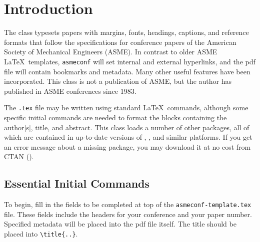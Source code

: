 \documentclass[captionpatch,colorlinks,upint,subscriptcorrection,varvw,german]{asmeconf}
\begin{document}
\begin{nomenclature}



\end{nomenclature}


\section{Introduction}
The \texttt{} class typesets papers with margins, fonts, headings, captions, and reference formats that follow the specifications for conference papers of the American Society of Mechanical Engineers (ASME). In contrast to older ASME \LaTeX\ templates, \texttt{asmeconf} will set internal and external hyperlinks, and the pdf file will contain bookmarks and metadata. Many other useful features have been incorporated. This class is not a publication of ASME, but the author has published in ASME conferences since 1983.

The \texttt{.tex} file may be written using standard \LaTeX\ commands, although some specific initial commands are needed to format the blocks containing the author[s], title, and abstract.  This class loads a number of other packages, all of which are contained in up-to-date versions of , , and similar platforms. If you get an error message about a missing package, you may download it at no cost from CTAN ().

\subsection{Essential Initial Commands}

To begin, fill in the fields to be completed at top of the \texttt{asmeconf-template.tex} file. These fields include the headers for your conference and your paper number. Specified metadata will be placed into the pdf file itself.
The title should be placed into \verb|\title{..}|.
\end{document}
